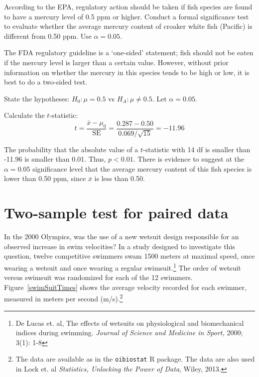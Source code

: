 \begin{examplewrap}
\begin{nexample}{According to the EPA, regulatory action should be taken if fish species are found to have a mercury level of 0.5 ppm or higher. Conduct a formal significance test to evaluate whether the average mercury content of croaker white fish (Pacific) is different from 0.50 ppm. Use $\alpha = 0.05$.}

The FDA regulatory guideline is a `one-sided' statement; fish should not be eaten if the mercury level is larger than a certain value. However, without prior information on whether the mercury in this species tends to be high or low, it is best to do a two-sided test.

State the hypotheses: $H_0: \mu = 0.5$ vs $H_A: \mu \neq 0.5$. Let $\alpha = 0.05$.

Calculate the $t$-statistic: 
\[t = \frac{\overline{x} - \mu_0}{\text{SE}} = \frac{0.287 - 0.50}{0.069/\sqrt{15}} = -11.96\]

The probability that the absolute value of a $t$-statistic with 14 df is smaller than -11.96 is smaller than 0.01. Thus, $p < 0.01$. There is evidence to suggest at the $\alpha = 0.05$ significance level that the average mercury content of this fish species is lower than 0.50 ppm, since $\overline{x}$ is less than 0.50.
\end{nexample}
\end{examplewrap}	




\section{Two-sample test for paired data}
\label{pairedData}


In the 2000 Olympics, was the use of a new wetsuit design responsible for an observed increase in swim velocities? In a study designed to investigate this question, twelve competitive swimmers swam 1500 meters at maximal speed, once wearing a wetsuit and once wearing a regular swimsuit.\footnote{De Lucas et. al, The effects of wetsuits on physiological and biomechanical indices during swimming. \textit{Journal of Science and Medicine in Sport,} 2000; 3(1): 1-8} The order of wetsuit versus swimsuit was randomized for each of the 12 swimmers. Figure~\ref{swimSuitTimes} shows the average velocity recorded for each swimmer, measured in meters per second (m/s).\footnote{The data are available as  in the \texttt{oibiostat} \textsf{R} package. The data are also used in Lock et. al \textit{Statistics, Unlocking the Power of Data}, Wiley, 2013.}

